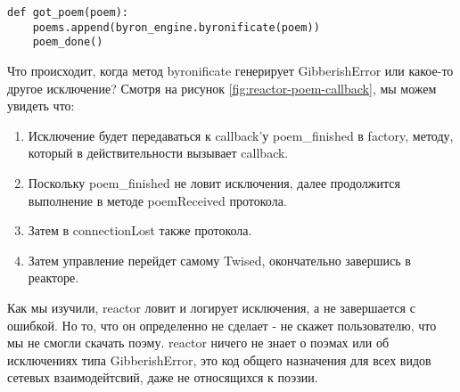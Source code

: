  \begin{verbatim}
def got_poem(poem):
    poems.append(byron_engine.byronificate(poem))
    poem_done()
\end{verbatim} 


Что происходит, когда метод byronificate генерирует GibberishError или 
какое-то другое исключение? Смотря на рисунок \ref{fig:reactor-poem-callback}, 
мы можем увидеть что: 

\begin{enumerate}
   
\item Исключение будет передаваться к callback'у poem\_finished в factory, 
методу, который в действительности вызывает callback. 

\item Поскольку poem\_finished не ловит исключения, далее продолжится 
выполнение в методе poemReceived протокола. 

\item Затем в connectionLost также протокола.

\item Затем управление перейдет самому Twised, окончательно 
завершись в реакторе. 

\end{enumerate}

Как мы изучили, reactor ловит и логирует 
исключения, а не завершается с ошибкой. Но то, что он 
определенно не сделает - не скажет пользователю, что 
мы не смогли скачать поэму. reactor ничего не знает о поэмах 
или об исключениях типа GibberishError, это код общего 
назначения для всех видов сетевых взаимодейтсвий, даже 
не относящихся к поэзии.


